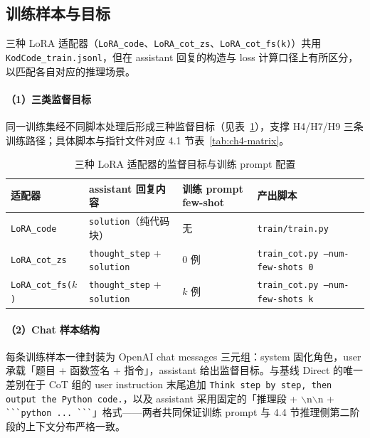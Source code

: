 \subsection{训练样本与目标}

三种 LoRA 适配器（\texttt{LoRA\_code}、\texttt{LoRA\_cot\_zs}、\texttt{LoRA\_cot\_fs(k)}）共用 \texttt{KodCode\_train.jsonl}，但在 assistant 回复的构造与 loss 计算口径上有所区分，以匹配各自对应的推理场景。

\paragraph{（1）三类监督目标}
同一训练集经不同脚本处理后形成三种监督目标（见表~\ref{tab:ch4-lora-target}），支撑 H4/H7/H9 三条训练路径；具体脚本与指针文件对应 4.1 节表~\ref{tab:ch4-matrix}。
\begin{table}[!htb]
  \centering
  \caption{三种 LoRA 适配器的监督目标与训练 prompt 配置}
  \label{tab:ch4-lora-target}
  \footnotesize
  \begin{tabular}{llll}
    \toprule
    适配器 & assistant 回复内容 & 训练 prompt few-shot & 产出脚本 \\
    \midrule
    \texttt{LoRA\_code}       & \texttt{solution}（纯代码块） & 无 & \texttt{train/train.py} \\
    \texttt{LoRA\_cot\_zs}    & \texttt{thought\_step} + \texttt{solution} & 0 例 & \texttt{train\_cot.py --num-few-shots 0} \\
    \texttt{LoRA\_cot\_fs($k$)} & \texttt{thought\_step} + \texttt{solution} & $k$ 例 & \texttt{train\_cot.py --num-few-shots k} \\
    \bottomrule
  \end{tabular}
\end{table}

\paragraph{（2）Chat 样本结构}
每条训练样本一律封装为 OpenAI chat messages 三元组：system 固化角色，user 承载「题目 + 函数签名 + 指令」，assistant 给出监督目标。与基线 Direct 的唯一差别在于 CoT 组的 user instruction 末尾追加 \texttt{Think step by step, then output the Python code.}，以及 assistant 采用固定的「推理段 + $\backslash$n$\backslash$n + \verb|```python ... ```|」格式——两者共同保证训练 prompt 与 4.4 节推理侧第二阶段的上下文分布严格一致。

